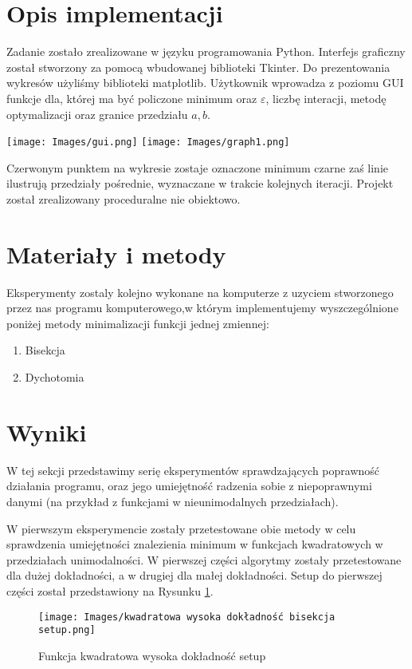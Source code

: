 \documentclass{classrep}
\begin{document}
\section{Opis implementacji}
{Zadanie zostało zrealizowane w języku programowania Python. Interfejs graficzny został stworzony za pomocą wbudowanej biblioteki Tkinter. Do prezentowania wykresów użyliśmy biblioteki matplotlib. Użytkownik wprowadza z poziomu GUI funkcje dla, której ma być policzone minimum oraz $\varepsilon$, liczbę interacji, metodę optymalizacji oraz granice przedziału $a,b$.}
\begin{center}
\texttt{[image: Images/gui.png]}
\texttt{[image: Images/graph1.png]}
\end{center}
Czerwonym punktem na wykresie zostaje oznaczone minimum czarne zaś linie ilustrują przedziały pośrednie, wyznaczane w trakcie kolejnych iteracji. Projekt został zrealizowany proceduralne nie obiektowo.


\section{Materiały i metody}
{Eksperymenty zostaly kolejno wykonane na komputerze z uzyciem stworzonego przez nas programu komputerowego,w którym implementujemy wyszczególnione poniżej metody minimalizacji funkcji jednej zmiennej:
\begin{enumerate}
  \item Bisekcja
  \item Dychotomia
\end{enumerate}


}

\section{Wyniki}
W tej sekcji przedstawimy serię eksperymentów sprawdzających poprawność działania programu, oraz jego umiejętność radzenia sobie z niepoprawnymi danymi (na przykład z funkcjami w nieunimodalnych przedziałach). 

W pierwszym eksperymencie zostały przetestowane obie metody w celu sprawdzenia umiejętności znalezienia minimum w funkcjach kwadratowych w przedziałach unimodalności. W pierwszej części algorytmy zostały przetestowane dla dużej dokładności, a w drugiej dla małej dokładności. Setup do pierwszej części został przedstawiony na Rysunku \ref{setup_wysoka_dokladnosc}.

\begin{figure}[H]
    \centering
    \texttt{[image: Images/kwadratowa wysoka dokładność bisekcja setup.png]}
    \caption[Funkcja kwadratowa wysoka dokładność setup]{Funkcja kwadratowa wysoka dokładność setup}
    \label{setup_wysoka_dokladnosc}
\end{figure}
\end{document}
